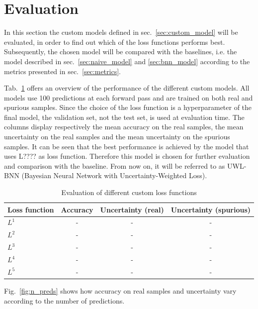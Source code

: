 \documentclass[11pt,twoside,a4paper]{article}
\begin{document}
\section{Evaluation}
\label{sec:evaluation}
In this section the custom models defined in sec.~\ref{sec:custom_model} will be evaluated, in order to find out which of the loss functions performs best. Subsequently, the chosen model will be compared with the baselines, i.e. the model described in sec.~\ref{sec:naive_model} and \ref{sec:bnn_model} according to the metrics presented in sec.~\ref{sec:metrics}.

Tab.~\ref{tab:custom} offers an overview of the performance of the different custom models. All models use 100 predictions at each forward pass and are trained on both real and spurious samples. Since the choice of the loss function is a hyperparameter of the final model, the validation set, not the test set, is used at evaluation time. The columns display respectively the mean accuracy on the real samples, the mean uncertainty on the real samples and the mean uncertainty on the spurious samples. It can be seen that the best performance is achieved by the model that uses L???? as loss function. Therefore this model is chosen for further evaluation and comparison with the baseline. From now on, it will be referred to as UWL-BNN (Bayesian Neural Network with Uncertainty-Weighted Loss).

\begin{table}[!h]
  \begin{adjustwidth}{-.5in}{-.5in}
  \begin{center}
    \begin{tabular}{l | c | c | c}
      Loss function	& Accuracy	& Uncertainty (real)	& Uncertainty (spurious) \\
      \hline
      \(L^1\)		& -		& - 			& - \\      
      \(L^2\)		& -		& - 			& - \\      
      \(L^3\)		& -		& - 			& - \\      
      \(L^4\)		& -		& - 			& - \\      
      \(L^5\)		& -		& - 			& - \\      
    \end{tabular}
    \caption{Evaluation of different custom loss functions}
    \label{tab:custom}
  \end{center}
  \end{adjustwidth}
\end{table}

Fig.~\ref{fig:n_preds} shows how accuracy on real samples and uncertainty vary according to the number of predictions.
\end{document}
